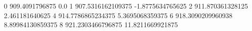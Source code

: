0 909.4091796875 0.0
1 907.5316162109375 -1.8775634765625
2 911.870361328125 2.461181640625
4 914.7786865234375 5.3695068359375
6 918.3090209960938 8.89984130859375
8 921.2303466796875 11.8211669921875
